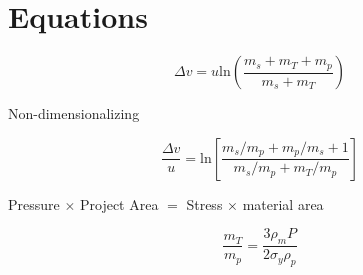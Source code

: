 \section{Equations}

\begin{equation} 
	\Delta v = u \mathrm{ln}(\frac{m_s + m_T + m_p}{m_s + m_T})
\end{equation}

Non-dimensionalizing

\begin{equation} 
	\frac{\Delta v}{u} = \mathrm{ln}\left[\frac{m_s/m_p + m_p/m_s +1}{m_s/m_p + m_T/m_p}\right]
\end{equation}

Pressure $\times$ Project Area $=$ Stress $\times$ material area

\begin{equation} 
	\frac{m_T}{m_p} = \frac{3\rho_mP}{2\sigma_y\rho_p}
\end{equation}